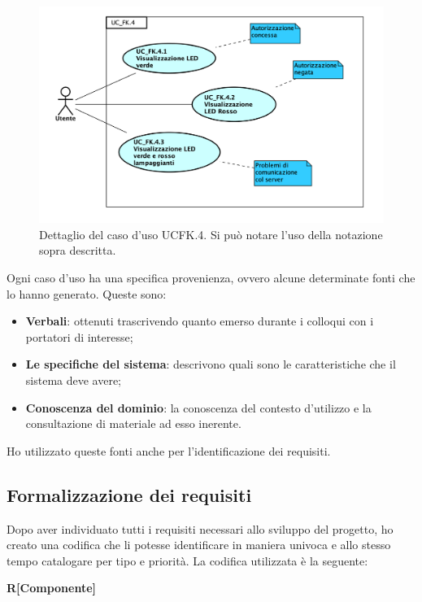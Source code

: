 \begin{figure}[H]
	\begin{center}
	\includegraphics[scale=0.4]{immagini/usecase/UC_FK_4.png}
	\caption{Dettaglio del caso d'uso UC\textunderscore FK.4. Si può notare l'uso della notazione sopra descritta.}
	\end{center}
\end{figure}

Ogni caso d'uso ha una specifica provenienza, ovvero alcune determinate fonti che lo hanno generato.
Queste sono:
\begin{itemize}
\item \textbf{Verbali}: ottenuti trascrivendo quanto emerso durante i colloqui con i portatori di interesse;
\item \textbf{Le specifiche del sistema}: descrivono quali sono le caratteristiche che il sistema deve avere;
\item \textbf{Conoscenza del dominio}: la conoscenza del contesto d'utilizzo e la consultazione di materiale ad esso inerente.
\end{itemize}

Ho utilizzato queste fonti anche per l'identificazione dei requisiti.

\subsection{Formalizzazione dei requisiti}
Dopo aver individuato tutti i requisiti necessari allo sviluppo del progetto, ho creato una codifica che li potesse identificare in maniera univoca e allo stesso tempo catalogare per tipo e priorità.
La codifica utilizzata è la seguente:

\begin{center}
\textbf{R[Componente]\textunderscore [Tipologia]}
\end{center}

